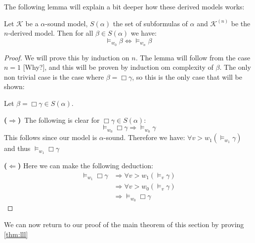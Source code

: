 \documentclass[../main.tex]{subfiles}
\begin{document}
The following lemma will explain a bit deeper how these derived models works:

\begin{lem}
	\label{lem:GLS}
	Let $\mathcal{K}$ be a $\alpha$-sound model, $S(\alpha)$ the set of
	subformulas of $\alpha$ and $\mathcal{K}^{(n)}$ be the $n$-derived
	model. Then for all $\beta\in S(\alpha)$ we have:
	$$\vDash_{w_0}\beta\Leftrightarrow\vDash_{w_n}\beta$$
\end{lem}
\begin{proof}
	We will prove this by induction on $n$. The lemma will follow from the
	case $n=1$ [Why?], and this will be proven by induction om complexity
	of $\beta$. The only non trivial case is the case where
	$\beta=\Box\gamma$, so this is the only case that will be shown:

	Let $\beta=\Box\gamma\in S(\alpha)$. 

	\textbf{($\Rightarrow$)}\ The following is clear for
	$\Box\gamma\in S(\alpha)$:
	$$\vDash_{w_0}\Box\gamma\Rightarrow\vDash_{w_0}\gamma$$
	This follows since our model is $\alpha$-sound. Therefore we have:
	$\forall v>w_1(\vDash_{w_1}\gamma)$ and thus $\vDash_{w_1}\Box\gamma$

	\textbf{($\Leftarrow$)} Here we can make the following deduction:
	\begin{align*}
		\vDash_{w_1}\Box\gamma&\Rightarrow\forall
		v>w_1(\vDash_v\gamma)\\
				      &\Rightarrow\forall
				      v>w_0(\vDash_v\gamma)\\
				      &\Rightarrow\vDash_{w_0}\Box\gamma
	\end{align*}
\end{proof}
We can now return to our proof of the main theorem of this section by proving
\ref{thm:lll}
\end{document}

